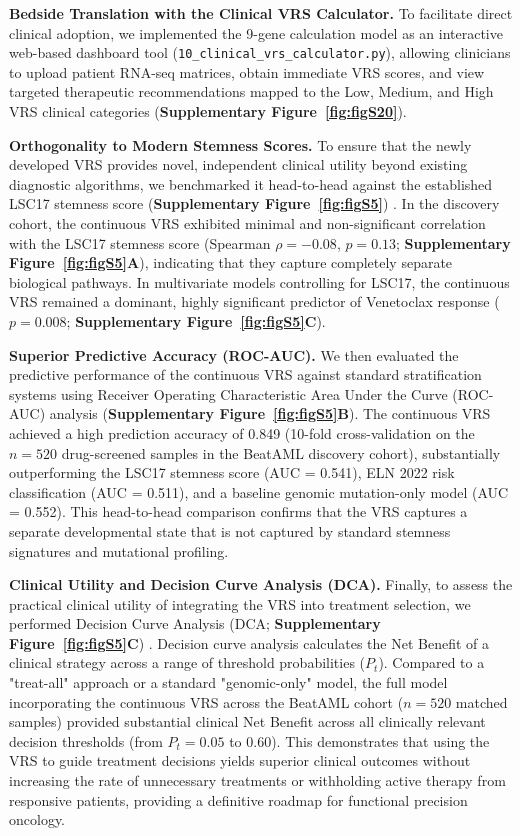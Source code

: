 \documentclass[11pt,a4paper]{article}
\begin{document}
\textbf{Bedside Translation with the Clinical VRS Calculator.} To facilitate direct clinical adoption, we implemented the 9-gene calculation model as an interactive web-based dashboard tool (\texttt{10\_clinical\_vrs\_calculator.py}), allowing clinicians to upload patient RNA-seq matrices, obtain immediate VRS scores, and view targeted therapeutic recommendations mapped to the Low, Medium, and High VRS clinical categories (\textbf{Supplementary Figure~\ref{fig:figS20}}).

\textbf{Orthogonality to Modern Stemness Scores.} To ensure that the newly developed VRS provides novel, independent clinical utility beyond existing diagnostic algorithms, we benchmarked it head-to-head against the established LSC17 stemness score (\textbf{Supplementary Figure~\ref{fig:figS5}}) \cite{ng2016lsc17}. In the discovery cohort, the continuous VRS exhibited minimal and non-significant correlation with the LSC17 stemness score (Spearman $\rho = -0.08$, $p = 0.13$; \textbf{Supplementary Figure~\ref{fig:figS5}A}), indicating that they capture completely separate biological pathways. In multivariate models controlling for LSC17, the continuous VRS remained a dominant, highly significant predictor of Venetoclax response ($p = 0.008$; \textbf{Supplementary Figure~\ref{fig:figS5}C}).

\textbf{Superior Predictive Accuracy (ROC-AUC).} We then evaluated the predictive performance of the continuous VRS against standard stratification systems using Receiver Operating Characteristic Area Under the Curve (ROC-AUC) analysis (\textbf{Supplementary Figure~\ref{fig:figS5}B}). The continuous VRS achieved a high prediction accuracy of 0.849 (10-fold cross-validation on the $n=520$ drug-screened samples in the BeatAML discovery cohort), substantially outperforming the LSC17 stemness score (AUC = 0.541), ELN 2022 risk classification (AUC = 0.511), and a baseline genomic mutation-only model (AUC = 0.552). This head-to-head comparison confirms that the VRS captures a separate developmental state that is not captured by standard stemness signatures and mutational profiling.

\textbf{Clinical Utility and Decision Curve Analysis (DCA).} Finally, to assess the practical clinical utility of integrating the VRS into treatment selection, we performed Decision Curve Analysis (DCA; \textbf{Supplementary Figure~\ref{fig:figS5}C}) \cite{vickers2006dca}. Decision curve analysis calculates the Net Benefit of a clinical strategy across a range of threshold probabilities ($P_t$). Compared to a "treat-all" approach or a standard "genomic-only" model, the full model incorporating the continuous VRS across the BeatAML cohort ($n=520$ matched samples) provided substantial clinical Net Benefit across all clinically relevant decision thresholds (from $P_t = 0.05$ to $0.60$). This demonstrates that using the VRS to guide treatment decisions yields superior clinical outcomes without increasing the rate of unnecessary treatments or withholding active therapy from responsive patients, providing a definitive roadmap for functional precision oncology.
\end{document}

